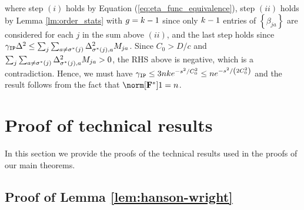 where step $(i)$ holds by Equation (\ref{eq:eta_func_equivalence}),
step $(ii)$ holds by Lemma \ref{lm:order_stats} with $g=k-1$
since only $k-1$ entries of $\left\{ \beta_{ja}\right\} $
are considered for each $j$ in the sum above $(ii)$, and the last
step holds since $\gamma_{\textup{\texttt{IP}}}\Delta^{2}\le\sum_{j}\sum_{a\ne\sigma^{*}(j)}\Delta_{\sigma^{*}(j),a}^{2}M_{ja}$.
Since $C_{0}>D/c$ and $\sum_{j}\sum_{a\ne\sigma^{*}(j)}\Delta_{\sigma^{*}(j),a}^{2}M_{ja}>0$,
the RHS above is negative, which is a contradiction. Hence, we must
have $\gamma_{\textup{\texttt{IP}}}\le3nk e^{-s^{2}/C_{0}^{2}}\le n e^{-s^{2}/\left(2C_{0}^{2}\right)}$
and the result follows from the fact that $\norm[\F^{*}]1=\num$.

\section{Proof of technical results}

In this section we provide the proofs of the technical results used
in the proofs of our main theorems.

\subsection{Proof of Lemma \ref{lem:hanson-wright}\label{sec:proof_hanson_wright}}

